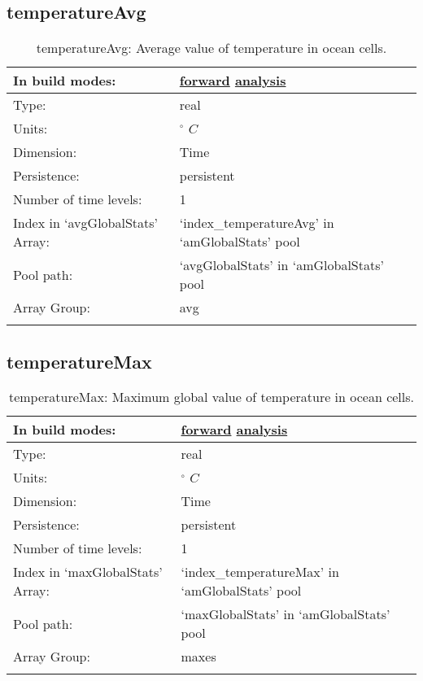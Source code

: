 \subsection[temperatureAvg]{temperatureAvg}
\label{subsec:var_sec_amGlobalStats_temperatureAvg}
\begin{center}
\begin{longtable}{| p{2.0in} | p{4.0in} |}
        \hline 
        In build modes: & \hyperref[subsec:forward_var_tab_amGlobalStats]{forward} \hyperref[subsec:analysis_var_tab_amGlobalStats]{analysis} \\
        \hline 
        Type: & real \\
        \hline 
        Units: & $^\circ$ $C$ \\
        \hline 
        Dimension: & Time \\
        \hline 
        Persistence: & persistent \\
        \hline 
        Number of time levels: & 1 \\
        \hline 
		 Index in `avgGlobalStats' Array: & `index\_temperatureAvg' in `amGlobalStats' pool \\
		 \hline 
            Pool path: & `avgGlobalStats' in `amGlobalStats' pool \\
		 \hline 
		 Array Group: & avg \\
		 \hline 
    \caption{temperatureAvg: Average value of temperature in ocean cells.}
\end{longtable}
\end{center}
\subsection[temperatureMax]{temperatureMax}
\label{subsec:var_sec_amGlobalStats_temperatureMax}
\begin{center}
\begin{longtable}{| p{2.0in} | p{4.0in} |}
        \hline 
        In build modes: & \hyperref[subsec:forward_var_tab_amGlobalStats]{forward} \hyperref[subsec:analysis_var_tab_amGlobalStats]{analysis} \\
        \hline 
        Type: & real \\
        \hline 
        Units: & $^\circ$ $C$ \\
        \hline 
        Dimension: & Time \\
        \hline 
        Persistence: & persistent \\
        \hline 
        Number of time levels: & 1 \\
        \hline 
		 Index in `maxGlobalStats' Array: & `index\_temperatureMax' in `amGlobalStats' pool \\
		 \hline 
            Pool path: & `maxGlobalStats' in `amGlobalStats' pool \\
		 \hline 
		 Array Group: & maxes \\
		 \hline 
    \caption{temperatureMax: Maximum global value of temperature in ocean cells.}
\end{longtable}
\end{center}

